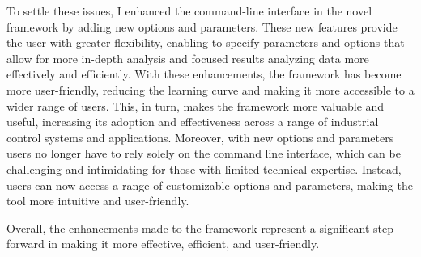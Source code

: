 \begin{description}
	\bigskip
	To settle these issues, I enhanced the command-line interface in the novel framework by adding new options and parameters. These new features provide the user with greater flexibility, enabling to specify parameters and options that allow for more in-depth analysis and focused results analyzing data more effectively and efficiently. With these enhancements, the framework has become more user-friendly, reducing the learning curve and making it more accessible to a wider range of users. \newline
	This, in turn, makes the framework more valuable and useful, increasing its adoption and effectiveness across a range of industrial control systems and applications. \newline
	Moreover, with new options and parameters users no longer have to rely solely on the command line interface, which can be challenging and intimidating for those with limited technical expertise. Instead, users can now access a range of customizable options and parameters, making the tool more intuitive and user-friendly. 
\end{description}
Overall, the enhancements made to the framework represent a significant step forward in making it more effective, efficient, and user-friendly.



%	
%	
%	

